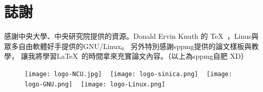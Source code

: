 \documentclass[class=NCU_thesis, crop=false]{standalone}
\begin{document}
\chapter{誌謝}

感謝中央大學、中央研究院提供的資源。Donald Ervin Knuth 的 \TeX\ ，Linus與眾多自由軟體好手提供的GNU/Linux。
另外特別感謝sppmg提供的論文樣板與教學\cite{_sppmg/tw_thesis_template_????}，
讓我將學習\LaTeX\ 的時間拿來充實論文內容。（以上為sppmg自肥 XD）

\begin{figure}[!hbt]
    \captionsetup[subfigure]{labelformat=empty}
    \centering
    \subcaptionbox
        {}
        {\texttt{[image: logo-NCU.jpg]}}
    ~
    \subcaptionbox
        {}
        {\texttt{[image: logo-sinica.png]}}
    ~
    \subcaptionbox
        {}
        {\texttt{[image: logo-GNU.png]}}
    ~
    \subcaptionbox
        {}
        {\texttt{[image: logo-Linux.png]}}
\end{figure}
\end{document}
